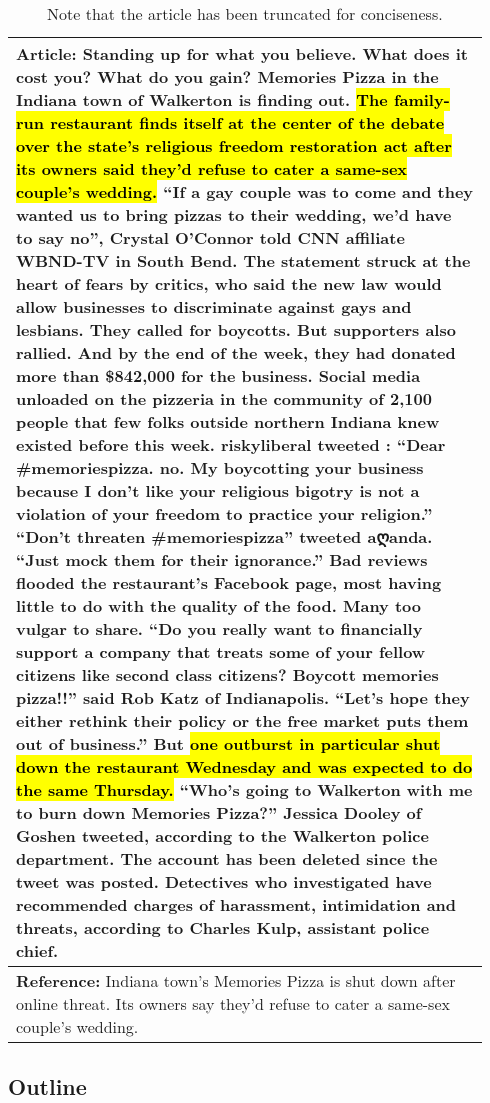 \begin{table}[t]
    \centering
    \small
    \begin{tabular}{|p{0.94\linewidth}|}
        \hline
        \textbf{Article}: Standing up for what you believe. What does it cost you? What do you gain? Memories Pizza in the Indiana town of Walkerton is finding out. \hl{The family-run restaurant finds itself at the center of the debate over the state's religious freedom restoration act after its owners said they'd refuse to cater a same-sex couple's wedding.} ``If a gay couple was to come and they wanted us to bring pizzas to their wedding, we'd have to say no'', Crystal O'Connor told CNN affiliate WBND-TV in South Bend. The statement struck at the heart of fears by critics, who said the new law would allow businesses to discriminate against gays and lesbians. They called for boycotts. But supporters also rallied. And by the end of the week, they had donated more than \$842,000 for the business. Social media unloaded on the pizzeria in the community of 2,100 people that few folks outside northern Indiana knew existed before this week. riskyliberal tweeted : ``Dear \#memoriespizza. no. My boycotting your business because I don't like your religious bigotry is not a violation of your freedom to practice your religion.'' ``Don't threaten \#memoriespizza'' tweeted aღanda. ``Just mock them for their ignorance.'' Bad reviews flooded the restaurant's Facebook page, most having little to do with the quality of the food. Many too vulgar to share. ``Do you really want to financially support a company that treats some of your fellow citizens like second class citizens? Boycott memories pizza!!'' said Rob Katz of Indianapolis. ``Let's hope they either rethink their policy or the free market puts them out of business.'' But \hl{one outburst in particular shut down the restaurant Wednesday and was expected to do the same Thursday.} ``Who's going to Walkerton with me to burn down Memories Pizza?'' Jessica Dooley of Goshen tweeted, according to the Walkerton police department. The account has been deleted since the tweet was posted. Detectives who investigated have recommended charges of harassment, intimidation and threats, according to Charles Kulp, assistant police chief. \\ \hline
        \textbf{Reference:} Indiana town's Memories Pizza is shut down after online threat. Its owners say they'd refuse to cater a same-sex couple's wedding. \\ \hline
    \end{tabular}
    \caption{Note that the article has been truncated for conciseness.}
    \label{tab:my_label}
\end{table}


\clearpage
\subsection{Outline}
